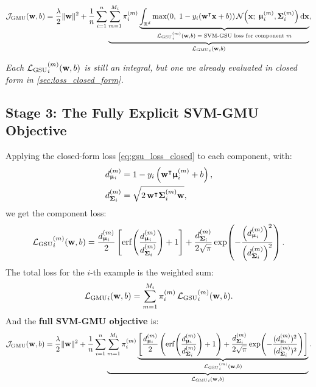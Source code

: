 \documentclass[11pt, letterpaper]{article}
\newcommand{\bSigma}{\vb{\Sigma}}
\newcommand{\bmu}{\boldsymbol{\upmu}}
\newcommand{\R}{\mathbb{R}}
\newcommand{\loss}{\mathcal{L}}
\newcommand{\obj}{\mathcal{J}}
\newcommand{\Norm}{\mathcal{N}}
\begin{document}
\begin{statusbox}
\vspace{-0.5em}
\begin{equation*}
    \obj_{\text{GMU}}(\vb{w}, b) = \frac{\lambda}{2}\|\vb{w}\|^2 + \frac{1}{n}\sum_{i=1}^{n}\underbrace{\sum_{m=1}^{M_i} \pi_i^{(m)} \underbrace{\int_{\R^d} \max\!\left(0,\; 1 - y_i(\vb{w}^{\intercal} \vb{x} + b)\right) \Norm\!\left(\vb{x};\; \bmu_i^{(m)}, \bSigma_i^{(m)}\right) \dd{\vb{x}}}_{{\loss_{\text{GSU}}}_{i}^{(m)}(\vb{w}, b) \;=\; \text{SVM-GSU loss for component } m}}_{{\loss_{\text{GMU}}}_{i}(\vb{w}, b)},
\end{equation*}
\vspace{-1em}
\begin{center}\small
\emph{Each ${\loss_{\text{GSU}}}_{i}^{(m)}(\vb{w}, b)$ is still an integral, but one we already evaluated in closed form in \cref{sec:loss_closed_form}.}
\end{center}
\end{statusbox}

\subsection{Stage 3: The Fully Explicit SVM-GMU Objective}

Applying the closed-form loss \cref{eq:gsu_loss_closed} to each component, with:
\begin{align}
    d_{\bmu_i}^{(m)} &= 1 - y_i\left(\vb{w}^{\intercal} \bmu_i^{(m)} + b\right), \label{eq:dmu_m}\\
    d_{\bSigma_i}^{(m)} &= \sqrt{2\, \vb{w}^{\intercal} \bSigma_i^{(m)} \vb{w}}, \label{eq:dsigma_m}
\end{align}
we get the component loss:
\begin{equation}\label{eq:component_loss}
    {\loss_{\text{GSU}}}_{i}^{(m)}(\vb{w}, b) = \frac{d_{\bmu_i}^{(m)}}{2}\left[\mathrm{erf}\!\left(\frac{d_{\bmu_i}^{(m)}}{d_{\bSigma_i}^{(m)}}\right) + 1\right] + \frac{d_{\bSigma_i}^{(m)}}{2\sqrt{\pi}}\exp\!\left(-\frac{\left(d_{\bmu_i}^{(m)}\right)^2}{\left(d_{\bSigma_i}^{(m)}\right)^2}\right).
\end{equation}
The total loss for the $i$-th example is the weighted sum:
\begin{equation}\label{eq:gmu_loss}
    {\loss_{\text{GMU}}}_{i}(\vb{w}, b) = \sum_{m=1}^{M_i} \pi_i^{(m)}\, {\loss_{\text{GSU}}}_{i}^{(m)}(\vb{w}, b).
\end{equation}
And the \textbf{full SVM-GMU objective} is:
\begin{equation}\label{eq:gmu_objective}
    \obj_{\text{GMU}}(\vb{w}, b) = \frac{\lambda}{2}\|\vb{w}\|^2
    + \frac{1}{n}\sum_{i=1}^{n}\underbrace{\sum_{m=1}^{M_i} \pi_i^{(m)}\underbrace{\left[\frac{d_{\bmu_i}^{(m)}}{2}\left(\mathrm{erf}\!\left(\frac{d_{\bmu_i}^{(m)}}{d_{\bSigma_i}^{(m)}}\right) + 1\right) + \frac{d_{\bSigma_i}^{(m)}}{2\sqrt{\pi}}\exp\!\left(-\frac{(d_{\bmu_i}^{(m)})^2}{(d_{\bSigma_i}^{(m)})^2}\right)\right]}_{{\loss_{\text{GSU}}}_{i}^{(m)}(\vb{w}, b)}}_{{\loss_{\text{GMU}}}_{i}(\vb{w}, b)}.
\end{equation}
\end{document}
